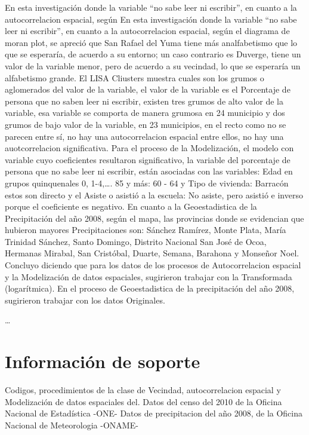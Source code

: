 \documentclass[11pt,]{article}
\begin{document}
En esta investigación donde la variable ``no sabe leer ni escribir'', en
cuanto a la autocorrelacion espacial, según En esta investigación donde
la variable ``no sabe leer ni escribir'', en cuanto a la autocorrelacion
espacial, según el diagrama de moran plot, se apreció que San Rafael del
Yuma tiene más analfabetismo que lo que se esperaría, de acuerdo a su
entorno; un caso contrario es Duverge, tiene un valor de la variable
menor, pero de acuerdo a su vecindad, lo que se esperaría un alfabetismo
grande. El LISA Cliusters muestra cuales son los grumos o aglomerados
del valor de la variable, el valor de la variable es el Porcentaje de
persona que no saben leer ni escribir, existen tres grumos de alto valor
de la variable, esa variable se comporta de manera grumosa en 24
municipio y dos grumos de bajo valor de la variable, en 23 municipios,
en el recto como no se parecen entre sí, no hay una autocorrelacion
espacial entre ellos, no hay una auotcorrelacion significativa. Para el
proceso de la Modelización, el modelo con variable cuyo coeficientes
resultaron significativo, la variable del porcentaje de persona que no
sabe leer ni escribir, están asociadas con las variables: Edad en grupos
quinquenales 0, 1-4,\ldots{}. 85 y más: 60 - 64 y Tipo de vivienda:
Barracón estos son directo y el Asiste o asistió a la escuela: No
asiste, pero asistió e inverso porque el coeficiente es negativo. En
cuanto a la Geoestadistica de la Precipitación del año 2008, según el
mapa, las provincias donde se evidencian que hubieron mayores
Precipitaciones son: Sánchez Ramírez, Monte Plata, María Trinidad
Sánchez, Santo Domingo, Distrito Nacional San José de Ocoa, Hermanas
Mirabal, San Cristóbal, Duarte, Semana, Barahona y Monseñor Noel.
Concluyo diciendo que para los datos de los procesos de Autocorrelacion
espacial y la Modelización de datos espaciales, sugirieron trabajar con
la Transformada (logarítmica). En el proceso de Geoestadistica de la
precipitación del año 2008, sugirieron trabajar con los datos
Originales.

\ldots

\section{Información de soporte}\label{informaciuxf3n-de-soporte}

Codigos, procedimientos de la clase de Vecindad, autocorrelacion
espacial y Modelización de datos espaciales del. Datos del censo del
2010 de la Oficina Nacional de Estadística -ONE- Datos de precipitacion
del año 2008, de la Oficina Nacional de Meteorologia -ONAME-
\end{document}

